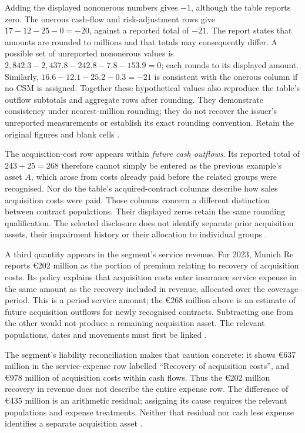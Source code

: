 Adding the displayed nononerous numbers gives $-1$, although the table reports
zero. The onerous cash-flow and risk-adjustment rows give $17-12-25-0=-20$,
against a reported total of $-21$. The report states that amounts are rounded
to millions and that totals may consequently differ. A possible set of
unreported nononerous values is $2{,}842.3-2{,}437.8-242.8-7.8-153.9=0$;
each rounds to its displayed amount. Similarly,
$16.6-12.1-25.2-0.3=-21$ is consistent with the onerous column if no CSM is
assigned. Together these hypothetical values also reproduce the table's
outflow subtotals and aggregate rows after rounding. They demonstrate
consistency under nearest-million rounding; they do not recover the issuer's
unreported measurements or establish its exact rounding convention. Retain
the original figures and blank cells \citep[printed pp. 155, 253]{munichre2023annual}.

\clearpage
The acquisition-cost row appears within \emph{future cash outflows}. Its
reported total of $243+25=268$ therefore cannot simply be entered as the
previous example's asset $A$, which arose from costs already paid before the
related groups were recognised. Nor do the table's acquired-contract columns
describe how sales acquisition costs were paid. Those columns concern a
different distinction between contract populations. Their displayed zeros
retain the same rounding qualification. The selected disclosure does not
identify separate prior acquisition assets, their impairment history or their
allocation to individual groups \citep[printed pp. 252--253]{munichre2023annual}.

A third quantity appears in the segment's service revenue. For 2023, Munich
Re reports €202 million as the portion of premium relating to recovery
of acquisition costs. Its policy explains that acquisition costs enter
insurance service expense in the same amount as the recovery included in
revenue, allocated over the coverage period. This is a period service amount;
the €268 million above is an estimate of future acquisition outflows for
newly recognised contracts. Subtracting one from the other would not produce
a remaining acquisition asset. The relevant populations, dates and movements
must first be linked \citep[printed pp. 177, 253, 264]{munichre2023annual}.

The segment's liability reconciliation makes that caution concrete: it shows
€637 million in the service-expense row labelled ``Recovery of acquisition
costs'', and €978 million of acquisition costs within cash flows. Thus the
€202 million recovery in revenue does not describe the entire expense row.
The difference of €435 million is an arithmetic residual; assigning its
cause requires the relevant populations and expense treatments. Neither that
residual nor cash less expense identifies a separate acquisition asset
\citep[printed pp. 230--231]{munichre2023annual}.


